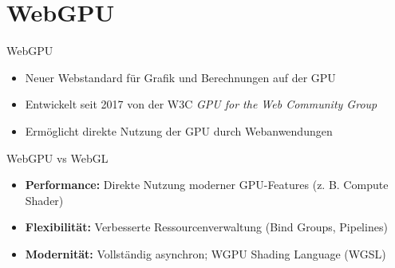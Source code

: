 \section{WebGPU}
\begin{frame}{WebGPU}
\begin{itemize}
\item Neuer Webstandard für Grafik und Berechnungen auf der GPU
\item Entwickelt seit 2017 von der W3C \emph{GPU for the Web Community Group}
\item Ermöglicht direkte Nutzung der GPU durch Webanwendungen
\end{itemize}
\end{frame}
\begin{frame}{WebGPU vs WebGL}
\begin{itemize}
    \item \textbf{Performance:} Direkte Nutzung moderner GPU-Features (z. B. Compute Shader)
    \item \textbf{Flexibilität:} Verbesserte Ressourcenverwaltung (Bind Groups, Pipelines)
    \item \textbf{Modernität:} Vollständig asynchron; WGPU Shading Language (WGSL)
\end{itemize}
\end{frame}